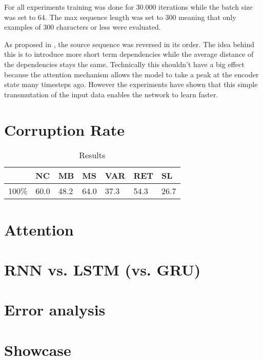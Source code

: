  For all experiments training was done for 30.000 iterations while the batch size was set to 64. The max sequence length was set to 300 meaning that only examples of 300 characters or less were evaluated.

  As proposed in \cite{seq2seq}, the source sequence was reversed in its order. The idea behind this is to introduce more short term dependencies while the average distance of the dependencies stays the same. Technically this shouldn't have a big effect because the attention mechanism allows the model to take a peak at the encoder state many timesteps ago. However the experiments have shown that this simple transmutation of the input data enables the network to learn faster.

  \section{Corruption Rate}

  \begin{table}[h]
  \begin{tabular}{ | m{2cm} | m{1cm} | m{1cm} | m{1cm} | m{1cm} | m{1cm} | m{1cm} | }
    \hline
    & NC & MB & MS & VAR & RET & SL \\
    \hline
    \hline
    100\% & 60.0 & 48.2 & 64.0 & 37.3 & 54.3 & 26.7 \\
    \hline
  \end{tabular}
  \caption{Results}
  \label{result_table}
  \end{table}

  \section{Attention}

  \section{RNN vs. LSTM (vs. GRU)}

  \section{Error analysis}

  \section{Showcase}
